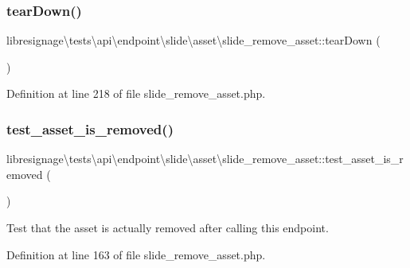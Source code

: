 \subsubsection{\texorpdfstring{tear\+Down()}{tearDown()}}
{\footnotesize\ttfamily libresignage\textbackslash{}tests\textbackslash{}api\textbackslash{}endpoint\textbackslash{}slide\textbackslash{}asset\textbackslash{}slide\+\_\+remove\+\_\+asset\+::tear\+Down (\begin{DoxyParamCaption}{ }\end{DoxyParamCaption})}



Definition at line 218 of file slide\+\_\+remove\+\_\+asset.\+php.

\mbox{\label{classlibresignage_1_1tests_1_1api_1_1endpoint_1_1slide_1_1asset_1_1slide__remove__asset_a1d3de7d04a10a3558b38ec9a5481c439}} 
\subsubsection{\texorpdfstring{test\+\_\+asset\+\_\+is\+\_\+removed()}{test\_asset\_is\_removed()}}
{\footnotesize\ttfamily libresignage\textbackslash{}tests\textbackslash{}api\textbackslash{}endpoint\textbackslash{}slide\textbackslash{}asset\textbackslash{}slide\+\_\+remove\+\_\+asset\+::test\+\_\+asset\+\_\+is\+\_\+removed (\begin{DoxyParamCaption}{ }\end{DoxyParamCaption})}

Test that the asset is actually removed after calling this endpoint. 

Definition at line 163 of file slide\+\_\+remove\+\_\+asset.\+php.

